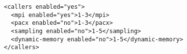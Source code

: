 \begin{verbatim}
<callers enabled="yes">
  <mpi enabled="yes">1-3</mpi>
  <pacx enabled="no">1-3</pacx>
  <sampling enabled="no">1-5</sampling>
  <dynamic-memory enabled="no">1-5</dynamic-memory>
</callers>
\end{verbatim}
